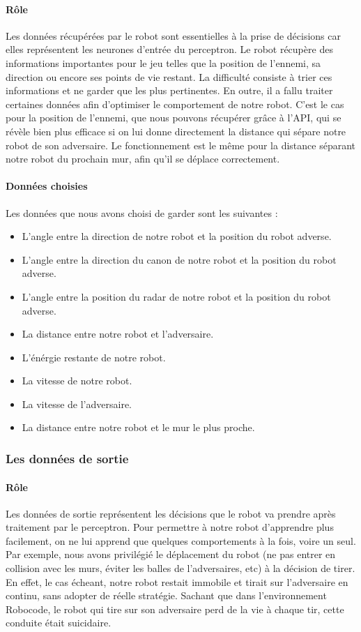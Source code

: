 \documentclass[a4paper,11pt]{article}
\begin{document}
\paragraph{Rôle}
Les données récupérées par le robot sont essentielles à la prise de décisions car elles représentent les neurones d'entrée du perceptron. Le robot récupère des informations importantes pour le jeu telles que la position de l'ennemi, sa direction ou encore ses points de vie restant. La difficulté consiste à trier ces informations et ne garder que les plus pertinentes. En outre, il a fallu traiter certaines données afin d'optimiser le comportement de notre robot. C'est le cas pour la position de l'ennemi, que nous pouvons récupérer grâce à l'API, qui se révèle bien plus efficace si on lui donne directement la distance qui sépare notre robot de son adversaire. Le fonctionnement est le même pour la distance séparant notre robot du prochain mur, afin qu'il se déplace correctement.

\paragraph{Données choisies}
Les données que nous avons choisi de garder sont les suivantes :

\begin{itemize}
\item L'angle entre la direction de notre robot et la position du robot adverse.
\item L'angle entre la direction du canon de notre robot et la position du robot adverse.
\item L'angle entre la position du radar de notre robot et la position du robot adverse.
\item La distance entre notre robot et l'adversaire.
\item L'énérgie restante de notre robot.
\item La vitesse de notre robot.
\item La vitesse de l'adversaire.
\item La distance entre notre robot et le mur le plus proche.
\end{itemize}

\subsubsection{Les données de sortie}

\paragraph{Rôle}
Les données de sortie représentent les décisions que le robot va prendre après traitement par le perceptron. Pour permettre à notre robot d'apprendre plus facilement, on ne lui apprend que quelques comportements à la fois, voire un seul. Par exemple, nous avons privilégié le déplacement du robot (ne pas entrer en collision avec les murs, éviter les balles de l'adversaires, etc) à la décision de tirer. En effet, le cas écheant, notre robot restait immobile et tirait sur l'adversaire en continu, sans adopter de réelle stratégie. Sachant que dans l'environnement Robocode, le robot qui tire sur son adversaire perd de la vie à chaque tir, cette conduite était suicidaire.
\end{document}
